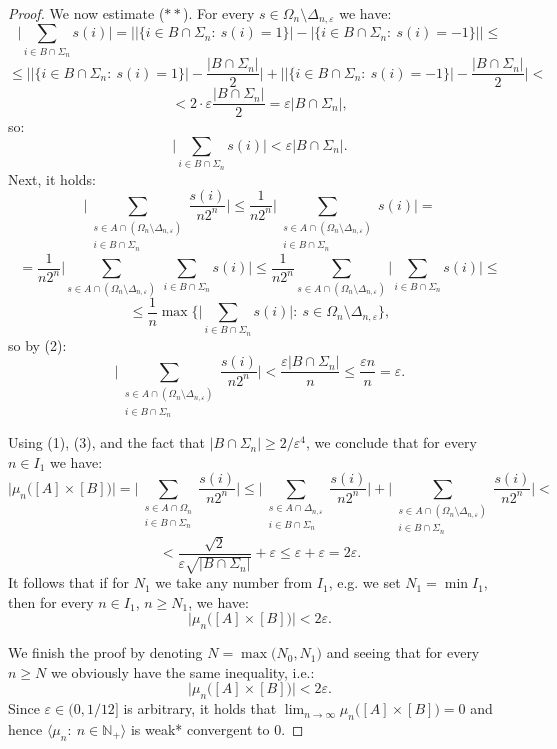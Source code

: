 \documentclass[11pt]{amsart}
\theoremstyle{definition}
\theoremstyle{remark}
\numberwithin{equation}{section}
\newcommand{\eps}{\varepsilon}
\newcommand{\N}{\mathbb{N}}
\newcommand{\sm}{\setminus}
\newcommand{\seq}[2]{\big\langle#1\colon\ #2\big\rangle}
\newcommand{\io}{\in\mathbb{N}}%
\begin{document}
\begin{proof}
\medskip

We now estimate ($**$). For every $s\in\Omega_n\sm \Delta_{n,\eps}$ we have:
\[\big|\sum_{i\in B\cap\Sigma_n}s(i)\big|=\Big|\big|\big\{i\in B\cap\Sigma_n\colon\ s(i)=1\big\}\big|-\big|\big\{i\in B\cap\Sigma_n\colon\ s(i)=-1\big\}\big|\Big|\le\]
\[\le\Big|\big|\big\{i\in B\cap\Sigma_n\colon\ s(i)=1\big\}\big|-\frac{\big|B\cap\Sigma_n\big|}{2}\Big|+\Big|\big|\big\{i\in B\cap\Sigma_n\colon\ s(i)=-1\big\}\big|-\frac{\big|B\cap\Sigma_n\big|}{2}\Big|<\]
\[<2\cdot\eps\frac{\big|B\cap\Sigma_n\big|}{2}=\eps\big|B\cap\Sigma_n\big|,\]
so:
\[\tag{$2$}\big|\sum_{i\in B\cap\Sigma_n}s(i)\big|<\eps\big|B\cap\Sigma_n\big|.\]
Next, it holds:
\[\Big|\sum_{\substack{s\in A\cap(\Omega_n\sm\Delta_{n,\eps})\\i\in B\cap\Sigma_n}}\frac{s(i)}{n2^n}\Big|\le\frac{1}{n2^n}\Big|\sum_{\substack{s\in A\cap(\Omega_n\sm\Delta_{n,\eps})\\i\in B\cap\Sigma_n}}s(i)\Big|=\]
\[=\frac{1}{n2^n}\Big|\sum_{s\in A\cap(\Omega_n\sm\Delta_{n,\eps})}\ \sum_{i\in B\cap\Sigma_n}s(i)\Big|\le\frac{1}{n2^n}\sum_{s\in A\cap(\Omega_n\sm\Delta_{n,\eps})}\big|\sum_{i\in B\cap\Sigma_n}s(i)\big|\le\]
\[\le\frac{1}{n}\max\Big\{\big|\sum_{i\in B\cap\Sigma_n}s(i)\big|\colon\ s\in\Omega_n\sm\Delta_{n,\eps}\Big\},\]
so by (2):
\[\tag{$3$}\Big|\sum_{\substack{s\in A\cap(\Omega_n\sm\Delta_{n,\eps})\\i\in B\cap\Sigma_n}}\frac{s(i)}{n2^n}\Big|<\frac{\eps\big|B\cap\Sigma_n\big|}{n}\le\frac{\eps n}{n}=\eps.\]

\medskip

Using (1), (3), and the fact that $\big|B\cap\Sigma_n\big|\ge2/\eps^4$, we conclude that for every $n\in I_1$ we have:
\[\big|\mu_n\big([A]\times[B]\big)\big|=\Big|\sum_{\substack{s\in A\cap\Omega_n\\i\in B\cap\Sigma_n}}\frac{s(i)}{n2^n}\Big|\le\Big|\sum_{\substack{s\in A\cap\Delta_{n,\eps}\\i\in B\cap\Sigma_n}}\frac{s(i)}{n2^n}\Big|+\Big|\sum_{\substack{s\in A\cap(\Omega_n\sm\Delta_{n,\eps})\\i\in B\cap\Sigma_n}}\frac{s(i)}{n2^n}\Big|<\]
\[<\frac{\sqrt{2}}{\eps\sqrt{\big|B\cap\Sigma_n\big|}}+\eps\le\eps+\eps=2\eps.\]
It follows that if for $N_1$ we take any number from $I_1$, e.g. we set $N_1=\min I_1$, then for every $n\in I_1$, $n\ge N_1$, we have:
\[\big|\mu_n\big([A]\times[B]\big)\big|<2\eps.\]

We finish the proof by denoting $N=\max\big(N_0,N_1\big)$ and seeing that for every $n\ge N$ we obviously have the same inequality, i.e.:
\[\big|\mu_n\big([A]\times[B]\big)\big|<2\eps.\]
Since $\eps\in\big(0,1/12\big]$ is arbitrary, it holds that $\lim_{n\to\infty}\mu_n\big([A]\times[B]\big)=0$ and hence $\seq{\mu_n}{n\io_+}$ is weak* convergent to $0$.
\end{proof}
\end{document}

